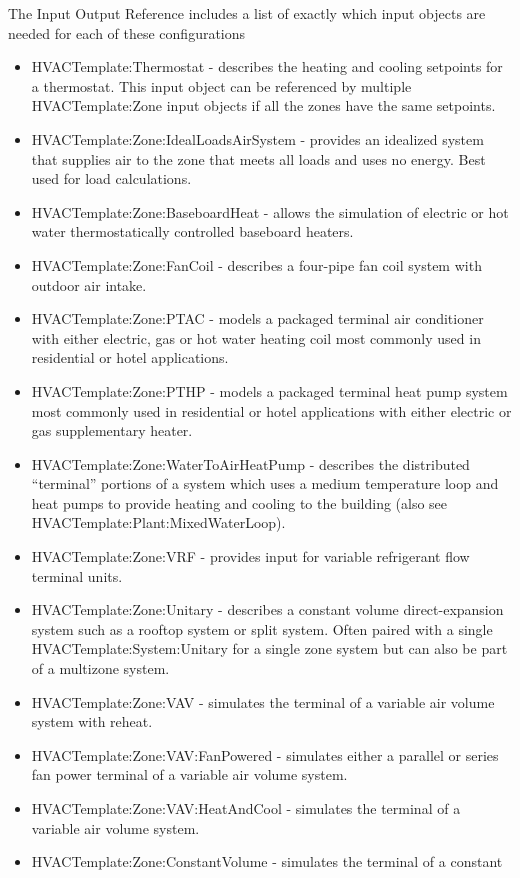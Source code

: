 The Input Output Reference includes a list of exactly which input
objects are needed for each of these configurations
\begin{itemize}
\item HVACTemplate:Thermostat - describes the heating and cooling setpoints
for a thermostat. This input object can be referenced by multiple
HVACTemplate:Zone input objects if all the zones have the same setpoints.
\item HVACTemplate:Zone:IdealLoadsAirSystem - provides an idealized system
that supplies air to the zone that meets all loads and uses no energy.
Best used for load calculations.
\item HVACTemplate:Zone:BaseboardHeat - allows the simulation of electric
or hot water thermostatically controlled baseboard heaters.
\item HVACTemplate:Zone:FanCoil - describes a four-pipe fan coil system
with outdoor air intake.
\item HVACTemplate:Zone:PTAC - models a packaged terminal air conditioner
with either electric, gas or hot water heating coil most commonly
used in residential or hotel applications.
\item HVACTemplate:Zone:PTHP - models a packaged terminal heat pump system
most commonly used in residential or hotel applications with either
electric or gas supplementary heater.
\item HVACTemplate:Zone:WaterToAirHeatPump - describes the distributed ``terminal''
portions of a system which uses a medium temperature loop and heat
pumps to provide heating and cooling to the building (also see HVACTemplate:Plant:MixedWaterLoop).
\item HVACTemplate:Zone:VRF - provides input for variable refrigerant flow
terminal units.
\item HVACTemplate:Zone:Unitary - describes a constant volume direct-expansion
system such as a rooftop system or split system. Often paired with
a single HVACTemplate:System:Unitary for a single zone system but
can also be part of a multizone system.
\item HVACTemplate:Zone:VAV - simulates the terminal of a variable air volume
system with reheat.
\item HVACTemplate:Zone:VAV:FanPowered - simulates either a parallel or
series fan power terminal of a variable air volume system.
\item HVACTemplate:Zone:VAV:HeatAndCool - simulates the terminal of a variable
air volume system.
\item HVACTemplate:Zone:ConstantVolume - simulates the terminal of a constant

\end{itemize}
